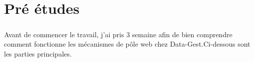 \chapter{Pré études}\thispagestyle{fancy}
\paragraph{}
Avant de commencer le travail, j'ai pris 3 semaine afin de bien comprendre comment fonctionne les mécanismes de pôle web chez Data-Gest.Ci-dessous sont les parties principales.



